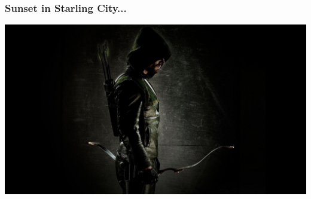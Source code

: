 \begin{frame}
	\frametitle{Sunset in Starling City...}

	\begin{center}
		\includegraphics[width=\textwidth]{images/arrow.jpg}
	\end{center}

\end{frame}




